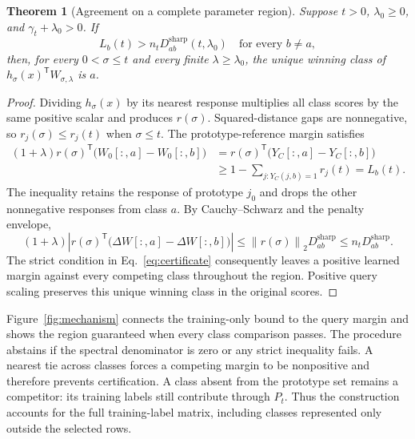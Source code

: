 \documentclass[preprint,12pt,authoryear]{elsarticle}
\newtheorem{theorem}{Theorem}
\newcommand{\norm}[1]{\left\lVert#1\right\rVert}
\newcommand{\tr}{\mathsf{T}}
\newcommand{\sharpb}{\mathrm{sharp}}
\begin{document}
\begin{theorem}[Agreement on a complete parameter region]
Suppose $t>0$, $\lambda_0\geq0$, and $\gamma_t+\lambda_0>0$. If
\begin{equation}
 L_b(t)>n_tD^{\sharpb}_{ab}(t,\lambda_0)
 \quad\text{for every }b\ne a,
 \label{eq:certificate}
\end{equation}
then, for every $0<\sigma\leq t$ and every finite $\lambda\geq\lambda_0$, the unique winning class of $h_\sigma(x)^\tr W_{\sigma,\lambda}$ is $a$.
\label{thm:agreement}
\end{theorem}
\begin{proof}
Dividing $h_\sigma(x)$ by its nearest response multiplies all class scores by the same positive scalar and produces $r(\sigma)$. Squared-distance gaps are nonnegative, so $r_j(\sigma)\leq r_j(t)$ when $\sigma\leq t$. The prototype-reference margin satisfies
\begin{align*}
 (1+\lambda)r(\sigma)^\tr\bigl(W_0[:,a]-W_0[:,b]\bigr)
 &=r(\sigma)^\tr\bigl(Y_C[:,a]-Y_C[:,b]\bigr)\\
 &\geq 1-\sum_{j:Y_C(j,b)=1}r_j(t)=L_b(t).
\end{align*}
The inequality retains the response of prototype $j_0$ and drops the other nonnegative responses from class $a$. By Cauchy--Schwarz and the penalty envelope,
\[
 (1+\lambda)\left|r(\sigma)^\tr
       \bigl(\Delta W[:,a]-\Delta W[:,b]\bigr)\right|
 \leq \norm{r(\sigma)}_2D^{\sharpb}_{ab}
 \leq n_tD^{\sharpb}_{ab}.
\]
The strict condition in Eq.~\eqref{eq:certificate} consequently leaves a positive learned margin against every competing class throughout the region. Positive query scaling preserves this unique winning class in the original scores.
\end{proof}

Figure~\ref{fig:mechanism} connects the training-only bound to the query margin and shows the region guaranteed when every class comparison passes. The procedure abstains if the spectral denominator is zero or any strict inequality fails. A nearest tie across classes forces a competing margin to be nonpositive and therefore prevents certification. A class absent from the prototype set remains a competitor: its training labels still contribute through $P_t$. Thus the construction accounts for the full training-label matrix, including classes represented only outside the selected rows.
\end{document}

